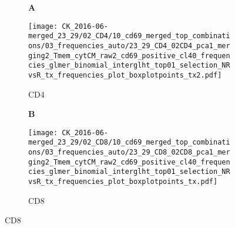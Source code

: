\documentclass[a4paper, 12pt]{article}
\begin{document}
\begin{figure}[!thb]
\centering
    
    \caption{}
    \begin{subfigure}[t]{0.02\textwidth}
    \vskip 0pt
        \textbf{\textsf{\normalsize A}}
    \end{subfigure}
    \begin{subfigure}[t]{0.45\textwidth}
    \vskip 0pt
    \caption{CD4}
        \texttt{[image: CK\_2016-06-merged\_23\_29/02\_CD4/10\_cd69\_merged\_top\_combinations/03\_frequencies\_auto/23\_29\_CD4\_02CD4\_pca1\_merging2\_Tmem\_cytCM\_raw2\_cd69\_positive\_cl40\_frequencies\_glmer\_binomial\_interglht\_top01\_selection\_NRvsR\_tx\_frequencies\_plot\_boxplotpoints\_tx2.pdf]}
    \end{subfigure}
\quad
    \begin{subfigure}[t]{0.02\textwidth}
    \vskip 0pt
        \textbf{\textsf{\normalsize B}}
    \end{subfigure}
    \begin{subfigure}[t]{0.45\textwidth}
    \vskip 0pt
    \caption{CD8}
        \texttt{[image: CK\_2016-06-merged\_23\_29/02\_CD8/10\_cd69\_merged\_top\_combinations/03\_frequencies\_auto/23\_29\_CD8\_02CD8\_pca1\_merging2\_Tmem\_cytCM\_raw2\_cd69\_positive\_cl40\_frequencies\_glmer\_binomial\_interglht\_top01\_selection\_NRvsR\_tx\_frequencies\_plot\_boxplotpoints\_tx.pdf]}
    \end{subfigure}
    
\end{figure}
\end{document}
